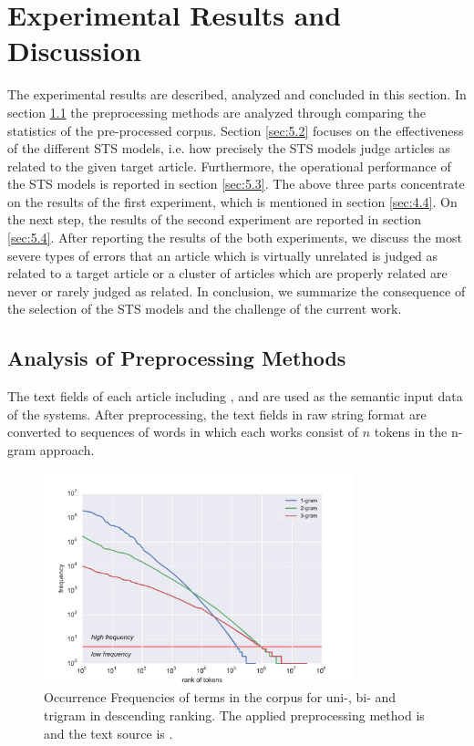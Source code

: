 \section{Experimental Results and Discussion}
\label{sec:5}

The experimental results are described, analyzed and concluded in this section. In section \ref{sec:5.1} the preprocessing methods are analyzed through comparing the statistics of the pre-processed corpus. Section \ref{sec:5.2} focuses on the effectiveness of the different STS models, i.e. how precisely the STS models judge articles as related to the given target article. Furthermore, the operational performance of the STS models is reported in section \ref{sec:5.3}. The above three parts concentrate on the results of the first experiment, which is mentioned in section \ref{sec:4.4}. On the next step, the results of the second experiment are reported in section \ref{sec:5.4}. After reporting the results of the both experiments, we discuss the most severe types of errors that an article which is virtually unrelated is judged as related to a target article or a cluster of articles which are properly related are never or rarely judged as related. In conclusion, we summarize the consequence of the selection of the STS models and the challenge of the current work. 

\bigbreak

\subsection{Analysis of Preprocessing Methods}
\label{sec:5.1}

The text fields of each article including \icontent{}, \ititle{} and \isummary{} are used as the semantic input data of the systems. After preprocessing, the text fields in raw string format are converted to sequences of words in which each works consist of $n$ tokens in the n-gram approach. 

\begin{figure}[!htb]
    \centering
    \includegraphics[width=0.8\textwidth]{fig/freqdist}
    \caption{Occurrence Frequencies of terms in the corpus for uni-, bi- and trigram in descending ranking. The applied preprocessing method is \iSE{} and the text source is \icontent{}.}
    \label{fig:freqdist}
\end{figure}



